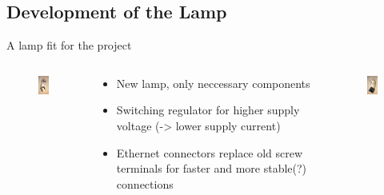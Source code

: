 \documentclass{beamer}
\begin{document}
 \subsection{Development of the Lamp}
  \begin{frame}{A lamp fit for the project}
    \begin{columns}
      \begin{column}{3.5cm}
        \begin{figure}
          \begin{center}
          \includegraphics[width=3cm]{bilder/lampe1.JPG}
          \end{center}
        \end{figure}
      \end{column}
      \begin{column}{5cm}
        \begin{itemize}
        \item New lamp, only neccessary components
        \item Switching regulator for higher supply voltage (-> lower supply current)
        \item Ethernet connectors replace old screw terminals for faster and more stable(?) connections
        \end{itemize}
      \end{column}
      \begin{column}{3.5cm}
         \begin{figure}
          \begin{center}
          \includegraphics[width=3cm]{bilder/lampe2.JPG}
          \end{center}
        \end{figure}
     \end{column}
    \end{columns}
  \end{frame}
\end{document}
